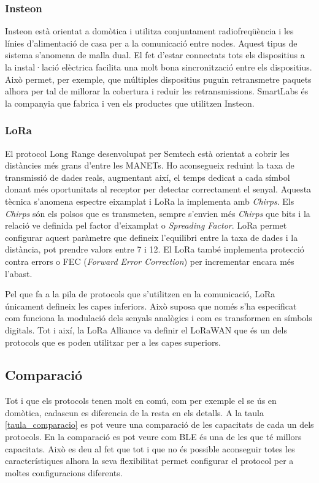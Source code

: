 \subsubsection{Insteon}
Insteon està orientat a domòtica i utilitza conjuntament radiofreqüència i les línies d'alimentació de casa per a la comunicació entre nodes.
Aquest tipus de sistema s'anomena de malla dual.
El fet d'estar connectats tots els dispositius a la instal·lació elèctrica facilita una molt bona sincronització entre els dispositius.
Això permet, per exemple, que múltiples dispositius puguin retransmetre paquets alhora per tal de millorar la cobertura i reduir les retransmissions.
SmartLabs és la companyia que fabrica i ven els productes que utilitzen Insteon.

\subsubsection{LoRa}
El protocol Long Range desenvolupat per Semtech està orientat a cobrir les distàncies més grans d'entre les MANETs.
Ho aconsegueix reduint la taxa de transmissió de dades reals, augmentant així, el temps dedicat a cada símbol donant més oportunitats al receptor per detectar correctament el senyal.
Aquesta tècnica s'anomena espectre eixamplat i LoRa la implementa amb \textit{Chirps}.
Els \textit{Chirps} són els polsos que es transmeten, sempre s'envien més \textit{Chirps} que bits i la relació ve definida pel factor d'eixamplat o \textit{Spreading Factor}.
LoRa permet configurar aquest paràmetre que defineix l'equilibri entre la taxa de dades i la distància, pot prendre valors entre 7 i 12.
El LoRa també implementa protecció contra errors o FEC (\textit{Forward Error Correction}) per incrementar encara més l'abast.

Pel que fa a la pila de protocols que s'utilitzen en la comunicació, LoRa únicament defineix les capes inferiors.
Això suposa que només s'ha especificat com funciona la modulació dels senyals analògics i com es transformen en símbols digitals.
Tot i així, la LoRa Alliance va definir el LoRaWAN que és un dels protocols que es poden utilitzar per a les capes superiors.


\subsection{Comparació}
Tot i que els protocols tenen molt en comú, com per exemple el se ús en domòtica, cadascun es diferencia de la resta en els detalls.
A la taula \ref{taula_comparacio} es pot veure una comparació de les capacitats de cada un dels protocols.
En la comparació es pot veure com BLE és una de les que té millors capacitats.
Això es deu al fet que tot i que no és possible aconseguir totes les característiques alhora la seva flexibilitat permet configurar el protocol per a moltes configuracions diferents.

